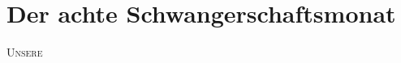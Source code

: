 

\chapter*{Der achte Schwangerschaftsmonat} 

\lettrine[lines=2, loversize=0.3, lraise=0]{\initfamily U}{nsere}
